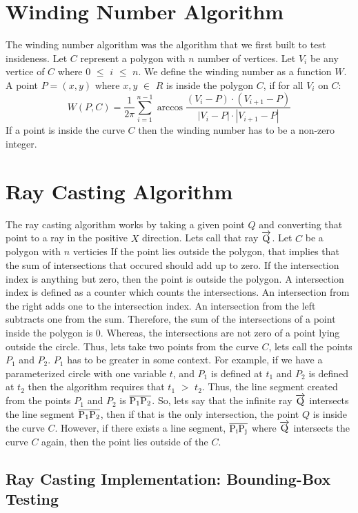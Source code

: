 \documentclass{article}
\begin{document}
\section{Winding Number Algorithm}
The winding number algorithm was the algorithm that we first built to test insideness.
Let $C$ represent a polygon with $n$ number of vertices.
Let $V_i$ be any vertice of $C$ where $0$ $\leq$ $i$ $\leq$ $n$.
We define the winding number as a function $W$.
A point $P = (x,y)$ where $x,y$ $\in$ $R$  is inside the polygon $C$, if for all $V_i$ on $C$:
$$
W(P,C) = \frac{1}{2\pi}\sum_{i=1}^{n-1}\arccos{\frac{(V_i-P)\cdot(V_{i+1}-P)}{|V_i-P|\cdot |V_{i+1}-P|}}
$$
If a point is inside the curve $C$ then the winding number has to be a non-zero integer.

\section{Ray Casting Algorithm}

The ray casting algorithm works by taking a given point $Q$ and converting that point to a ray in the positive $X$ direction.
Lets call that ray $\overrightarrow{\rm Q}$.
Let $C$ be a polygon with $n$ verticies 
If the point lies outside the polygon, that implies that the sum of intersections that occured should add up to zero.
If the intersection index is anything but zero, then the point is outside the polygon.
A intersection index is defined as a counter which counts the intersections. 
An intersection from the right adds one to the intersection index.
An intersection from the left subtracts one from the sum.
Therefore, the sum of the intersections of a point inside the polygon is 0.
Whereas, the intersections are not zero of a point lying outside the circle.
Thus, lets take two points from the curve $C$, lets call the points $P_1$ and $P_2$.
$P_1$ has to be greater in some context.
For example, if we have a parameterized circle with one variable $t$, and $P_1$ is defined at $t_1$ and $P_2$ is defined at $t_2$ then the algorithm requires that $t_1$ $>$ $t_2$.
Thus, the line segment created from the points $P_1$ and $P_2$ is $\overline{\rm P_1P_2}$.
So, lets say that the infinite ray $\overrightarrow{\rm Q}$ intersects the line segment $\overline{\rm P_1P_2}$, then if that is the only intersection, the point $Q$ is inside the curve $C$.
However, if there exists a line segment, $\overline{\rm P_iP_j}$ where $\overrightarrow{\rm Q}$ intersects the curve $C$ again, then the point lies outside of the $C$.

\subsection{Ray Casting Implementation: Bounding-Box Testing}
\end{document}
